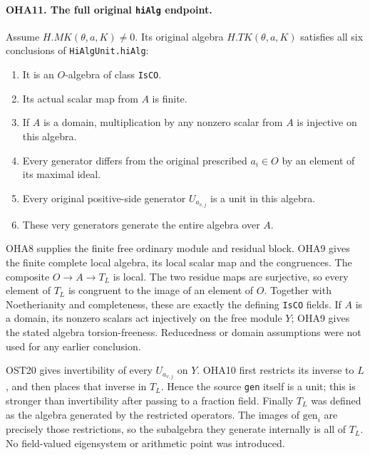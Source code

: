 \documentclass[11pt,a4paper]{article}
\numberwithin{equation}{section}
\theoremstyle{remark}\newtheorem{remark}[theorem]{Remark}
\begin{document}
\paragraph{OHA11. The full original \texttt{hi\allowbreak Alg} endpoint.}
\label{claim:OHA11}
Assume \(H.MK(\theta,\allowbreak{} a,\allowbreak{} K)\ne0\). Its original algebra
\(H.TK(\theta,\allowbreak{} a,\allowbreak{} K)\) satisfies all six conclusions of
\texttt{Hi\allowbreak Alg\allowbreak Unit.\allowbreak hi\allowbreak Alg}:
\begin{enumerate}
\item It is an \(O\)-algebra of class \texttt{Is\allowbreak CO}.
\item Its actual scalar map from \(A\) is finite.
\item If \(A\) is a domain, multiplication by any nonzero
  scalar from \(A\) is injective on this algebra.
\item Every generator differs from the original prescribed
  \(a_i\in O\) by an element of its maximal ideal.
\item Every original positive-side generator \(U_{a_{v,\allowbreak{} j}}\)
  is a unit in this algebra.
\item These very generators generate the entire algebra over \(A\).
\end{enumerate}

OHA8 supplies the finite free ordinary module and residual block.
OHA9 gives the finite complete local algebra, its local scalar
map and the congruences. The composite \(O\to A\to T_L\) is
local. The two residue maps are surjective, so every element
of \(T_L\) is congruent to the image of an element of \(O\).
Together with Noetherianity and completeness, these are
exactly the defining \texttt{Is\allowbreak CO} fields. If \(A\) is a domain,
its nonzero scalars act injectively on the free module \(Y\);
OHA9 gives the stated algebra torsion-freeness. Reducedness or
domain assumptions were not used for any earlier conclusion.

OST20 gives invertibility of every \(U_{a_{v,\allowbreak{} j}}\) on \(Y\).
OHA10 first restricts its inverse to \(L\), and then places that
inverse in \(T_L\). Hence the source \texttt{gen} itself is a
unit; this is stronger than invertibility after passing to a
fraction field. Finally \(T_L\) was defined as the algebra
generated by the restricted operators. The images of
\(\mathrm{gen}_i\) are precisely those restrictions, so the
subalgebra they generate internally is all of \(T_L\).
No field-valued eigensystem or arithmetic point was introduced.
\end{document}
